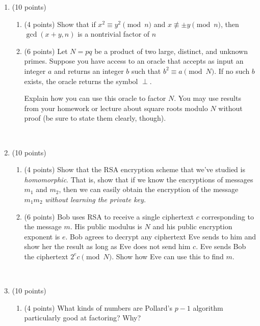 \documentclass[11pt]{article}
\theoremstyle{plain}
\begin{document}
\begin{enumerate}
    \item (10 points)

    \begin{enumerate}

        \item (4 points) Show that if $x^2 \equiv y^2 \pmod n$ and $x\not\equiv \pm y\pmod n$, then $\gcd(x+y, n)$ is a nontrivial factor of $n$

        \vfill

        \item (6 points) Let $N = pq$ be a product of two large, distinct, and unknown primes.
        Suppose you have access to an oracle that accepts as input an integer $a$ and returns an integer $b$ such that $b^2 \equiv a\pmod N$.
        If no such $b$ exists, the oracle returns the symbol $\perp$.

        Explain how you can use this oracle to factor $N$.
        You may use results from your homework or lecture about square roots modulo $N$ without proof (be sure to state them clearly, though).

        \vfill

    \end{enumerate}

    \newpage
    \ 
    \newpage

    \item (10 points)
    \begin{enumerate}
        \item (4 points) Show that the RSA encryption scheme that we've studied is \emph{homomorphic}.
        That is, show that if we know the encryptions of messages $m_1$ and $m_2$, then we can easily obtain the encryption of the message $m_1m_2$ \emph{without learning the private key.}
        \vfill

        \item (6 points) Bob uses RSA to receive a single ciphertext $c$ corresponding to the message $m$.
        His public modulus is $N$ and his public encryption exponent is $e$.
        Bob agrees to decrypt any ciphertext Eve sends to him and show her the result as long as Eve does not send him $c$.
        Eve sends Bob the ciphertext $2^ec\pmod N$.
        Show how Eve can use this to find $m$.
        \vfill
    \end{enumerate}

    \newpage
    \ 
    \newpage

    \item (10 points) 
    \begin{enumerate}
        \item (4 points) What kinds of numbers are Pollard's $p-1$ algorithm particularly good at factoring? Why?


\end{enumerate}
\end{enumerate}
\end{document}
